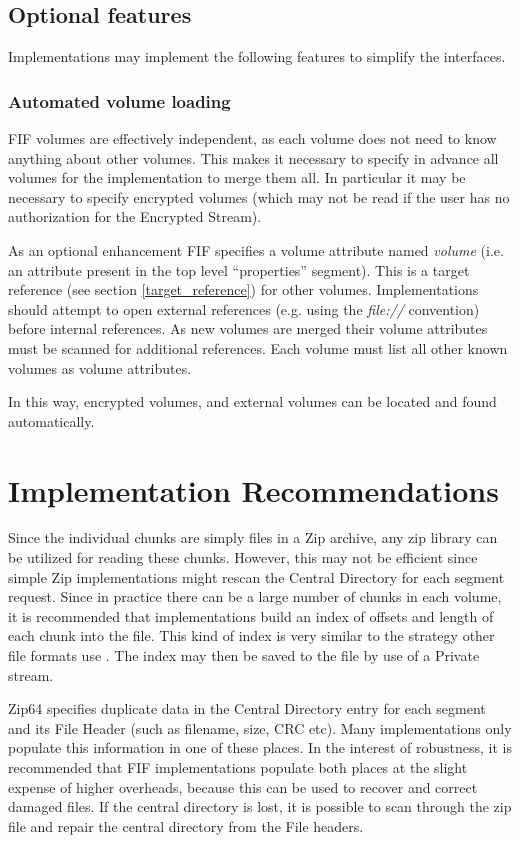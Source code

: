 \documentclass[10pt, conference]{IEEEtran}
\begin{document}
\subsection{Optional features}
Implementations may implement the following features to simplify the
interfaces.

\subsubsection{Automated volume loading}
FIF volumes are effectively independent, as each volume does not need
to know anything about other volumes. This makes it necessary to
specify in advance all volumes for the implementation to merge them
all. In particular it may be necessary to specify encrypted volumes
(which may not be read if the user has no authorization for the
Encrypted Stream).

As an optional enhancement FIF specifies a volume attribute named {\em
volume} (i.e. an attribute present in the top level ``properties''
segment). This is a target reference (see section
\ref{target_reference}) for other volumes. 
Implementations should attempt to open external references (e.g. using
the {\em file://} convention) before internal references. As new
volumes are merged their volume attributes must be scanned for
additional references. Each volume must list all other known volumes
as volume attributes.

In this way, encrypted volumes, and external volumes can be located
and found automatically.


\section{Implementation Recommendations}
Since the individual chunks are simply files in a Zip archive, any zip
library can be utilized for reading these chunks. However, this may
not be efficient since simple Zip implementations might rescan the
Central Directory for each segment request. Since in practice there
can be a large number of chunks in each volume, it is recommended that
implementations build an index of offsets and length of each chunk
into the file. This kind of index is very similar to the strategy
other file formats use \cite{EWF}. The index may then be saved to the
file by use of a Private stream.

Zip64 specifies duplicate data in the Central Directory entry for each
segment and its File Header (such as filename, size, CRC etc). Many
implementations only populate this information in one of these
places. In the interest of robustness, it is recommended that FIF
implementations populate both places at the slight expense of higher
overheads, because this can be used to recover and correct damaged
files. If the central directory is lost, it is possible to scan
through the zip file and repair the central directory from the File
headers.
\end{document}
